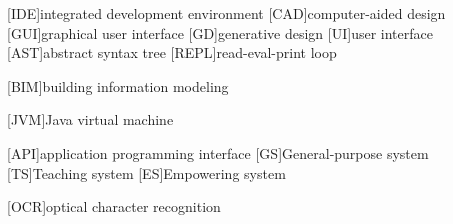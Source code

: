 
% 
% 

\begin{acronym}

[IDE]{integrated development environment}
[CAD]{computer-aided design}
[GUI]{graphical user interface}
[GD]{generative design}
[UI]{user interface}
[AST]{abstract syntax tree}
[REPL]{read-eval-print loop}

[BIM]{building information modeling}

[JVM]{Java virtual machine}


[API]{application programming interface}
[GS]{General-purpose system}
[TS]{Teaching system}
[ES]{Empowering system}

[OCR]{optical character recognition}

\end{acronym}